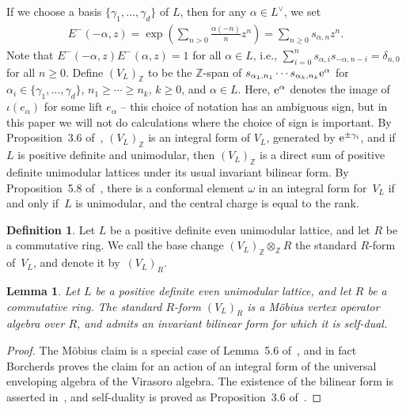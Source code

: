\documentclass[pdftex]{sigma}
\newcommand{\bZ}{\mathbb{Z}}
\newtheorem{lem}[thm]{Lemma}
\theoremstyle{definition}
\newtheorem{defn}[thm]{Definition}
\begin{document}
If we choose a basis $\{ \gamma_1,\ldots,\gamma_d\}$ of $L$, then for any $\alpha \in L^\vee$, we set
\begin{gather*} E^-(-\alpha,z) = \exp \left( \sum_{n > 0} \frac{\alpha(-n)}{n}z^n \right) = \sum_{n \geq 0} s_{\alpha, n} z^n. \end{gather*}
Note that $E^-(-\alpha,z)E^-(\alpha,z) = 1$ for all $\alpha \in L$, i.e., $\sum\limits_{i=0}^n s_{\alpha,i} s_{-\alpha,n-i} = \delta_{n,0}$ for all $n \geq 0$. Define $(V_L)_{\bZ}$ to be the $\bZ$-span of $s_{\alpha_1,n_1} \cdots s_{\alpha_k,n_k} {\rm e}^\alpha$ for $\alpha_i \in \{ \gamma_1,\ldots,\gamma_d\}$, $n_1 \geq \cdots \geq n_k$, $k \geq 0$, and $\alpha \in L$. Here, ${\rm e}^\alpha$ denotes the image of $\iota(e_\alpha)$ for some lift $e_\alpha$ -- this choice of notation has an ambiguous sign, but in this paper we will not do calculations where the choice of sign is important. By Proposition~3.6 of~\cite{DG12}, $(V_L)_{\bZ}$ is an integral form of $V_L$, generated by ${\rm e}^{\pm\gamma_i}$, and if~$L$ is positive definite and unimodular, then $(V_L)_{\bZ}$ is a direct sum of positive definite unimodular lattices under its usual invariant bilinear form. By Proposition~5.8 of~\cite{M14}, there is a conformal element $\omega$ in an integral form for~$V_L$ if and only if~$L$ is unimodular, and the central charge is equal to the rank.

\begin{defn}Let $L$ be a positive definite even unimodular lattice, and let $R$ be a commutative ring. We call the base change $(V_L)_{\bZ} \otimes_{\bZ} R$ the standard $R$-form of~$V_L$, and denote it by~$(V_L)_R$.
\end{defn}

\begin{lem} \label{lem:standard-R-form}Let $L$ be a positive definite even unimodular lattice, and let $R$ be a commutative ring. The standard $R$-form $(V_L)_R$ is a M\"obius vertex operator algebra over $R$, and admits an invariant bilinear form for which it is self-dual.
\end{lem}
\begin{proof}The M\"obius claim is a special case of Lemma~5.6 of~\cite{B99}, and in fact Borcherds proves the claim for an action of an integral form of the universal enveloping algebra of the Virasoro algebra. The existence of the bilinear form is asserted in~\cite{B86}, and self-duality is proved as Proposition~3.6 of~\cite{DG12}.
\end{proof}
\end{document}
